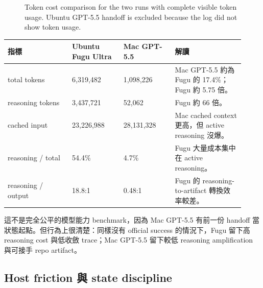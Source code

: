 \documentclass[UTF8,a4paper,11pt]{ctexart}
\begin{document}
\begin{figure}[htbp]
\centering
{}
\caption{Token cost comparison for the two runs with complete visible token usage. Ubuntu GPT-5.5 handoff is excluded because the log did not show token usage.}
\end{figure}

\begin{longtable}{L{0.25\linewidth} L{0.20\linewidth} L{0.20\linewidth} L{0.27\linewidth}}
\toprule
指標 & Ubuntu Fugu Ultra & Mac GPT-5.5 & 解讀\\
\midrule
total tokens & 6,319,482 & 1,098,226 & Mac GPT-5.5 約為 Fugu 的 17.4\%；Fugu 約 5.75 倍。\\
reasoning tokens & 3,437,721 & 52,062 & Fugu 約 66 倍。\\
cached input & 23,226,988 & 28,131,328 & Mac cached context 更高，但 active reasoning 沒爆。\\
reasoning / total & 54.4\% & 4.7\% & Fugu 大量成本集中在 active reasoning。\\
reasoning / output & 18.8:1 & 0.48:1 & Fugu 的 reasoning-to-artifact 轉換效率較差。\\
\bottomrule
\end{longtable}

這不是完全公平的模型能力 benchmark，因為 Mac GPT-5.5 有前一份 handoff 當狀態起點。但行為上很清楚：同樣沒有 official success 的情況下，Fugu 留下高 reasoning cost 與低收斂 trace；Mac GPT-5.5 留下較低 reasoning amplification 與可接手 repo artifact。

\subsection{Host friction 與 state discipline}
\end{document}
